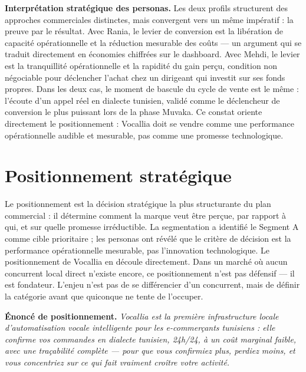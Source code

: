 \noindent\textbf{Interprétation stratégique des personas.} Les deux profils structurent des approches commerciales distinctes, mais convergent vers un même impératif : la preuve par le résultat. Avec Rania, le levier de conversion est la libération de capacité opérationnelle et la réduction mesurable des coûts --- un argument qui se traduit directement en économies chiffrées sur le dashboard. Avec Mehdi, le levier est la tranquillité opérationnelle et la rapidité du gain perçu, condition non négociable pour déclencher l'achat chez un dirigeant qui investit sur ses fonds propres. Dans les deux cas, le moment de bascule du cycle de vente est le même : l'écoute d'un appel réel en dialecte tunisien, validé comme le déclencheur de conversion le plus puissant lors de la phase Muvaka. Ce constat oriente directement le positionnement : Vocallia doit se vendre comme une performance opérationnelle audible et mesurable, pas comme une promesse technologique.

\section{Positionnement stratégique}
\label{section3.2}

Le positionnement est la décision stratégique la plus structurante du plan commercial : il détermine comment la marque veut être perçue, par rapport à qui, et sur quelle promesse irréductible. La segmentation a identifié le Segment A comme cible prioritaire ; les personas ont révélé que le critère de décision est la performance opérationnelle mesurable, pas l'innovation technologique. Le positionnement de Vocallia en découle directement. Dans un marché où aucun concurrent local direct n'existe encore, ce positionnement n'est pas défensif --- il est fondateur. L'enjeu n'est pas de se différencier d'un concurrent, mais de définir la catégorie avant que quiconque ne tente de l'occuper.

\medskip
\noindent\textbf{Énoncé de positionnement.} \textit{Vocallia est la première infrastructure locale d'automatisation vocale intelligente pour les e-commerçants tunisiens : elle confirme vos commandes en dialecte tunisien, 24h/24, à un coût marginal faible, avec une traçabilité complète --- pour que vous confirmiez plus, perdiez moins, et vous concentriez sur ce qui fait vraiment croître votre activité.}

